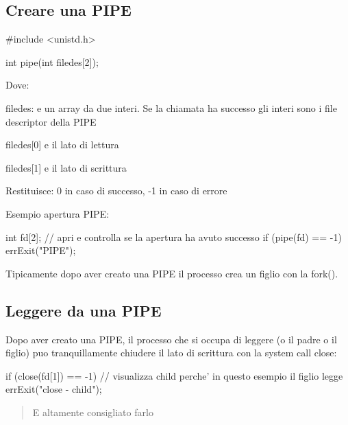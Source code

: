 \subsection*{Creare una P\+I\+PE}


\begin{DoxyCode}
\textcolor{preprocessor}{#include <unistd.h>}

\textcolor{keywordtype}{int} pipe(\textcolor{keywordtype}{int} filedes[2]);
\end{DoxyCode}


Dove\+:
\begin{DoxyItemize}
\item filedes\+: e\textquotesingle{} un array da due interi. Se la chiamata ha successo gli interi sono i file descriptor della P\+I\+PE
\begin{DoxyItemize}
\item filedes\mbox{[}0\mbox{]} e\textquotesingle{} il lato di lettura
\item filedes\mbox{[}1\mbox{]} e\textquotesingle{} il lato di scrittura
\end{DoxyItemize}
\item Restituisce\+: 0 in caso di successo, -\/1 in caso di errore
\end{DoxyItemize}

Esempio apertura P\+I\+PE\+: 
\begin{DoxyCode}
\textcolor{keywordtype}{int} fd[2];
\textcolor{comment}{// apri e controlla se la apertura ha avuto successo}
\textcolor{keywordflow}{if} (pipe(fd) == -1)
    errExit(\textcolor{stringliteral}{"PIPE"});
\end{DoxyCode}


Tipicamente dopo aver creato una P\+I\+PE il processo crea un figlio con la {\ttfamily fork()}.

\subsection*{Leggere da una P\+I\+PE}

Dopo aver creato una P\+I\+PE, il processo che si occupa di leggere (o il padre o il figlio) puo\textquotesingle{} tranquillamente chiudere il lato di scrittura con la system call close\+:


\begin{DoxyCode}
\textcolor{keywordflow}{if} (close(fd[1]) == -1)
    \textcolor{comment}{// visualizza child perche' in questo esempio il figlio legge}
    errExit(\textcolor{stringliteral}{"close - child"});
\end{DoxyCode}
 \begin{quote}
E\textquotesingle{} altamente consigliato farlo \end{quote}


